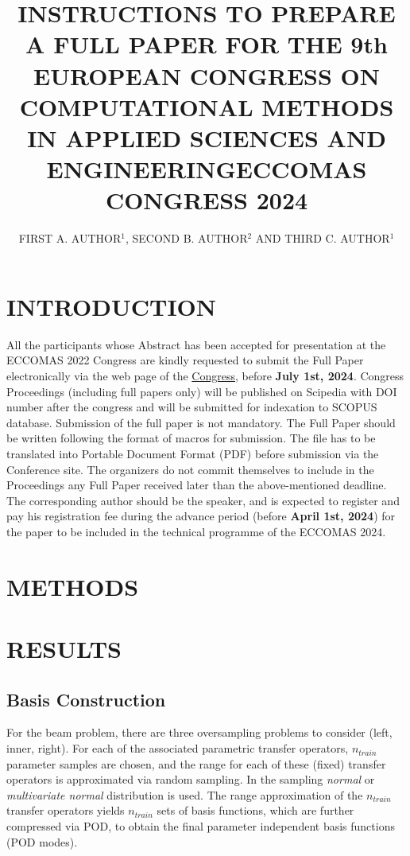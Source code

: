 \documentclass[a4paper]{eccomas_paper-2024}
\title{INSTRUCTIONS TO PREPARE A FULL PAPER FOR THE 9th EUROPEAN CONGRESS ON COMPUTATIONAL METHODS IN APPLIED SCIENCES AND ENGINEERING\break ECCOMAS CONGRESS 2024}
\author{FIRST A. AUTHOR$^1$, SECOND B. AUTHOR$^2$ AND THIRD C. AUTHOR$^1$}
\begin{document}
\thispagestyle{empty}

\section{INTRODUCTION}

All the participants whose Abstract has been accepted for presentation at the ECCOMAS 2022 Congress are kindly requested to submit the Full Paper electronically via the web page of the \href{https://eccomas2024.org/lisbon}{Congress}, before \textbf{July 1st, 2024}. Congress Proceedings (including full papers only) will be published on Scipedia with DOI number after the congress and will be submitted for indexation to SCOPUS database. Submission of the full paper is not mandatory. The Full Paper should be written following the format of macros for submission. The file has to be translated into Portable Document Format (PDF) before submission via the Conference site. The organizers do not commit themselves to include in the Proceedings any Full Paper received later than the above-mentioned deadline. The corresponding author should be the speaker, and is expected to register and pay his registration fee during the advance period (before \textbf{April 1st, 2024}) for the paper to be included in the technical programme of the ECCOMAS 2024.

\section{METHODS}

\section{RESULTS}

\subsection{Basis Construction}
For the beam problem, there are three oversampling problems to consider (left, inner, right).
For each of the associated parametric transfer operators, $n_{train}$ parameter samples are chosen, and
the range for each of these (fixed) transfer operators is approximated via random sampling. In
the sampling \textit{normal} or \textit{multivariate normal} distribution is used.
The range approximation of the $n_{train}$ transfer operators yields $n_{train}$ sets of
basis functions, which are further compressed via POD, to obtain the final parameter
independent basis functions (POD modes).
\end{document}
